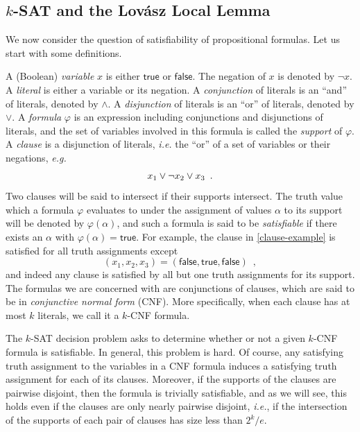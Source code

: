 \documentclass[prodmode,acmcsur]{acmsmall}
\begin{document}
\subsection{$k$-SAT and the Lov\'{a}sz Local Lemma}

We now consider the question of satisfiability of propositional
formulas. Let us start with some definitions.

A (Boolean) \emph{variable} $x$ is either $\textsf{true}$ or
$\textsf{false}$. The negation of $x$ is denoted by $\neg x$. A
\emph{literal} is either a variable or its negation. A
\emph{conjunction} of literals is an ``and'' of literals, denoted by
$\land$. A \emph{disjunction} of literals is an ``or'' of literals,
denoted by $\lor$. A \emph{formula} $\varphi$ is an expression
including conjunctions and disjunctions of literals, and the set of
variables involved in this formula is called the \emph{support} of
$\varphi$. A \emph{clause} is a disjunction of literals, \emph{i.e.}
the ``or'' of a set of variables or their negations, \emph{e.g.}
\begin{align}
  x_1 \lor \neg x_2 \lor x_3 \enspace . \eqlabel{clause-example}
\end{align}
Two clauses will be said to intersect if their supports intersect. The
truth value which a formula $\varphi$ evaluates to under the
assignment of values $\alpha$ to its support will be denoted by
$\varphi(\alpha)$, and such a formula is said to be \emph{satisfiable}
if there exists an $\alpha$ with $\varphi(\alpha) = \textsf{true}$.
For example, the clause in \eqref{clause-example} is satisfied for all
truth assignments except
\[
  (x_1, x_2, x_3) = (\textsf{false}, \textsf{true}, \textsf{false})
  \enspace ,
\]
and indeed any clause is satisfied by all but one truth assignments
for its support. The formulas we are concerned with are conjunctions
of clauses, which are said to be in \emph{conjunctive normal form}
(CNF). More specifically, when each clause has at most $k$
literals, we call it a $k$-CNF formula.

The $k$-SAT decision problem asks to determine whether or not a given
$k$-CNF formula is satisfiable. In general, this problem is hard. Of
course, any satisfying truth assignment to the variables in a CNF
formula induces a satisfying truth assignment for each of its
clauses. Moreover, if the supports of the clauses are pairwise
disjoint, then the formula is trivially satisfiable,
and as we will see, this holds even if the 
clauses are only nearly pairwise disjoint, \emph{i.e.},  if the
intersection of the supports of each pair of clauses
has size less than $2^k/e$.
\end{document}
